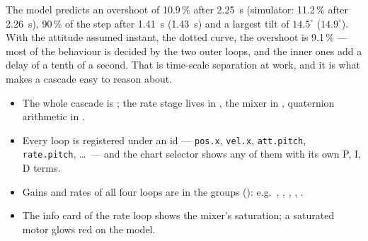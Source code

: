 
The model predicts an overshoot of 10.9\,\% after \SI{2.25}{s} (simulator: 11.2\,\% after \SI{2.26}{s}), 90\,\% of the step after \SI{1.41}{s} (\SI{1.43}{s}) and a largest tilt of $14.5^\circ$ ($14.9^\circ$). With the attitude assumed instant, the dotted curve, the overshoot is 9.1\,\% — most of the behaviour is decided by the two outer loops, and the inner ones add a delay of a tenth of a second. That is time-scale separation at work, and it is what makes a cascade easy to reason about.


\begin{inapp}
\begin{itemize}[leftmargin=1.2em]
  \item The whole cascade is ; the rate stage lives in , the mixer in , quaternion arithmetic in .
  \item Every loop is registered under an id — \texttt{pos.x}, \texttt{vel.x}, \texttt{att.pitch}, \texttt{rate.pitch}, \ldots\ — and the chart selector shows any of them with its own P, I, D terms.
  \item Gains and rates of all four loops are in the  groups (): e.g.\ , , , , .
  \item The info card of the rate loop shows the mixer's saturation; a saturated motor glows red on the model.
\end{itemize}
\end{inapp}


